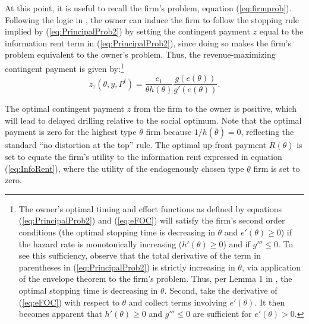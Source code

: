 \documentclass[12pt]{article}
\begin{document}
At this point, it is useful to recall the firm's problem, equation (\ref{eq:firmprob}). Following the logic in \citet{bib:board}, the owner can induce the firm to follow the stopping rule implied by (\ref{eq:PrincipalProb2}) by setting the contingent payment $z$ equal to the information rent term in (\ref{eq:PrincipalProb2}), since doing so makes the firm's problem equivalent to the owner's problem. Thus, the revenue-maximizing contingent payment is given by:\footnote{The owner's optimal timing and effort functions as defined by equations (\ref{eq:PrincipalProb2}) and (\ref{eq:eFOC}) will satisfy the firm's second order conditions (the optimal stopping time is decreasing in $\theta$ and $e'(\theta)\geq0$) if the hazard rate is monotonically increasing ($h'(\theta)\geq0$) and if $g'''\leq0$. To see this sufficiency, observe that the total derivative of the term in parentheses in (\ref{eq:PrincipalProb2}) is strictly increasing in $\theta$, via application of the envelope theorem to the firm's problem. Thus, per Lemma 1 in \citet{bib:board}, the optimal stopping time is decreasing in $\theta$. Second, take the derivative of (\ref{eq:eFOC}) with respect to $\theta$ and collect terms involving $e'(\theta)$. It then becomes apparent that $h'(\theta)\geq0$ and $g'''\leq0$ are sufficient for $e'(\theta)>0$.}
\begin{equation}
z_\tau(\theta,y,P^t) = \frac{c_1}{\theta h(\theta)}\frac{g(e(\theta))}{g'(e(\theta))}. \label{eq:ContPayment}
\end{equation}

The optimal contingent payment $z$ from the firm to the owner is positive, which will lead to delayed drilling relative to the social optimum. Note that the optimal payment is zero for the highest type $\bar{\theta}$ firm because $1/h(\bar{\theta})=0$, reflecting the standard ``no distortion at the top'' rule. The optimal up-front payment $R(\theta)$ is set to equate the firm's utility to the information rent expressed in equation (\ref{eq:InfoRent}), where the utility of the endogenously chosen type $\underline{\theta}$ firm is set to zero.
\end{document}
